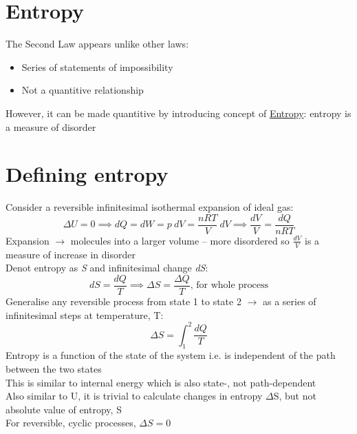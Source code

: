 \documentclass[a4paper, 11pt, fleqn, normalem]{report}
\begin{document}
\section{Entropy}
The Second Law appears unlike other laws:
\begin{itemize}
	\item Series of statements of impossibility
	\item Not a quantitive relationship
\end{itemize}
However, it can be made quantitive by introducing concept of \underline{Entropy}: entropy is a measure of disorder

\section{Defining entropy}
Consider a reversible infinitesimal isothermal expansion of ideal gas:
\begin{equation*}
	{\Delta}U = 0 \implies dQ = dW = p\:dV = \frac{nRT}{V}\:dV \implies \frac{dV}{V} = \frac{dQ}{nRT}
\end{equation*}
Expansion $\rightarrow$ molecules into a larger volume -- more disordered so $\frac{dV}{V}$ is a measure of increase in disorder \\
Denot entropy as \emph{S} and infinitesimal change \emph{dS}:
\begin{equation*}
	dS = \frac{dQ}{T} \implies {\Delta}S = \frac{{\Delta}Q}{T} \text{, for whole process}
\end{equation*}
Generalise any reversible process from state 1 to state 2 $\rightarrow$ as a series of infinitesimal steps at temperature, T:
\begin{equation*}
	{\Delta}S = \int_{1}^{2} \frac{dQ}{T}
\end{equation*}
Entropy is a function of the state of the system i.e. is independent of the path between the two states \\
This is similar to internal energy which is also state-, not path-dependent \\
Also similar to U, it is trivial to calculate changes in entropy $\Delta$S, but not absolute value of entropy, S \\
For reversible, cyclic processes, ${\Delta}S = 0$
\end{document}
